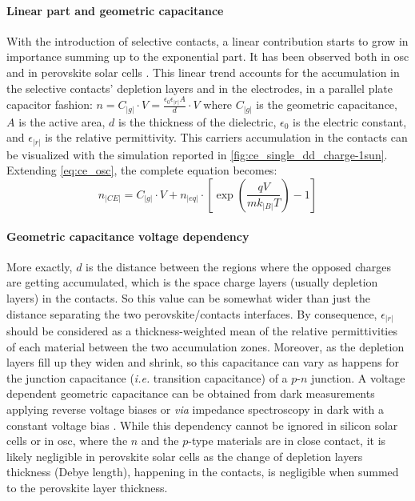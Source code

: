 		\paragraph{Linear part and geometric capacitance}\label{geometric_capacitance}
		With the introduction of selective contacts, a linear contribution starts to grow in importance summing up to the exponential part.
		It has been observed both in \gls{osc} \cite{Ryan2017a,Credgington2014} and in perovskite solar cells \cite{Gelmetti2017,Wheeler2017,Du2018}.
		This linear trend accounts for the accumulation in the selective contacts' depletion layers and in the electrodes, in a parallel plate capacitor fashion: $n = C_|g| \cdot V = \frac{\epsilon_0 \epsilon_|r| A}{d} \cdot V$ where $C_|g|$ is the geometric capacitance, $A$ is the active area, $d$ is the thickness of the dielectric, $\epsilon_0$ is the electric constant, and $\epsilon_|r|$ is the relative permittivity.
		This carriers accumulation in the contacts can be visualized with the simulation reported in \cref{fig:ce_single_dd_charge-1sun}.
		Extending \cref{eq:ce_osc}, the complete equation becomes:
		\begin{equation}\label{eq:ce_full}
			n_|CE| = C_|g| \cdot V + n_|eq| \cdot \left[\exp(\frac{qV}{mk_|B|T}) - 1\right]
		\end{equation}

		\paragraph{Geometric capacitance voltage dependency}
		More exactly, $d$ is the distance between the regions where the opposed charges are getting accumulated, which is the space charge layers (usually depletion layers) in the contacts.
		So this value can be somewhat wider than just the distance separating the two perovskite/contacts interfaces.
		By consequence, $\epsilon_|r|$ should be considered as a thickness\hyp{}weighted mean of the relative permittivities of each material between the two accumulation zones.
		Moreover, as the depletion layers fill up they widen and shrink, so this capacitance can vary as happens for the junction capacitance (\textsl{i.e.} transition capacitance) of a $p$-$n$ junction.
		A voltage dependent geometric capacitance can be obtained from dark  measurements applying reverse voltage biases \cite{Kiermasch2018} or \textsl{via} impedance spectroscopy in dark with a constant voltage bias \cite{Brus2016,Pockett2015}.
		While this dependency cannot be ignored in silicon solar cells or in \gls{osc}, where the $n$ and the $p$-type materials are in close contact, it is likely negligible in perovskite solar cells as the change of depletion layers thickness (Debye length), happening in the contacts, is negligible when summed to the perovskite layer thickness.

